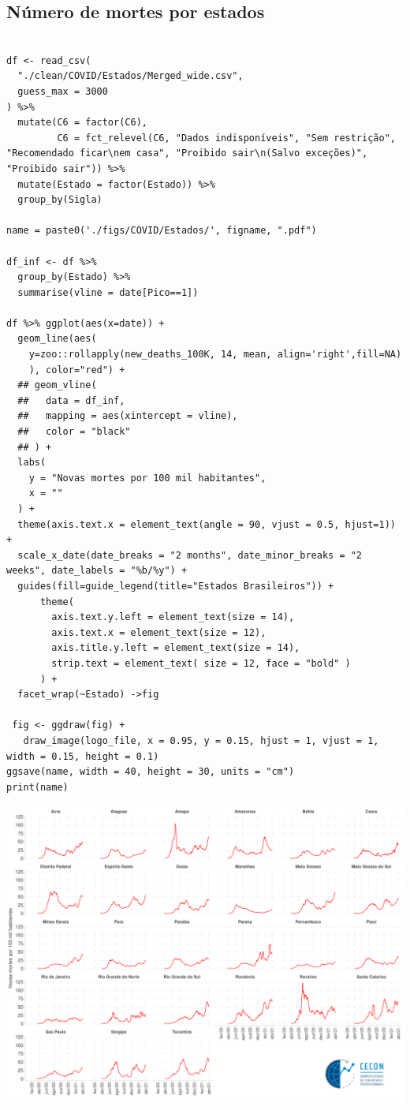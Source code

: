 \documentclass{SelfArx}
\begin{document}
\subsection*{Número de mortes por estados}
\label{sec:org0f77d61}

\begin{verbatim}

df <- read_csv(
  "./clean/COVID/Estados/Merged_wide.csv",
  guess_max = 3000
) %>%
  mutate(C6 = factor(C6),
         C6 = fct_relevel(C6, "Dados indisponíveis", "Sem restrição", "Recomendado ficar\nem casa", "Proibido sair\n(Salvo exceções)", "Proibido sair")) %>%
  mutate(Estado = factor(Estado)) %>%
  group_by(Sigla)

name = paste0('./figs/COVID/Estados/', figname, ".pdf")

df_inf <- df %>%
  group_by(Estado) %>%
  summarise(vline = date[Pico==1])

df %>% ggplot(aes(x=date)) +
  geom_line(aes(
    y=zoo::rollapply(new_deaths_100K, 14, mean, align='right',fill=NA)
    ), color="red") +
  ## geom_vline(
  ##   data = df_inf,
  ##   mapping = aes(xintercept = vline),
  ##   color = "black"
  ## ) +
  labs(
    y = "Novas mortes por 100 mil habitantes",
    x = ""
  ) +
  theme(axis.text.x = element_text(angle = 90, vjust = 0.5, hjust=1)) +
  scale_x_date(date_breaks = "2 months", date_minor_breaks = "2 weeks", date_labels = "%b/%y") +
  guides(fill=guide_legend(title="Estados Brasileiros")) +
      theme(
        axis.text.y.left = element_text(size = 14),
        axis.text.x = element_text(size = 12),
        axis.title.y.left = element_text(size = 14),
        strip.text = element_text( size = 12, face = "bold" )
      ) +
  facet_wrap(~Estado) ->fig

 fig <- ggdraw(fig) +
   draw_image(logo_file, x = 0.95, y = 0.15, hjust = 1, vjust = 1, width = 0.15, height = 0.1)
ggsave(name, width = 40, height = 30, units = "cm")
print(name)
\end{verbatim}

\begin{center}
\includegraphics[width=.9\linewidth]{./figs/COVID/Estados/Mortes.pdf}
\end{center}
\end{document}

